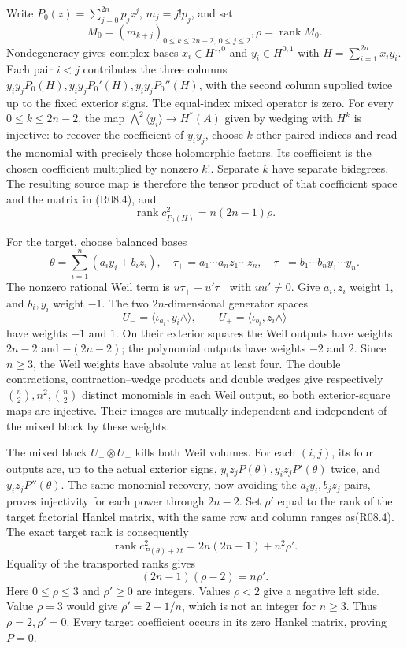Write $P_0(z)=\sum_{j=0}^{2n}p_jz^j$, $m_j=j!p_j$, and set
\[
 M_0=(m_{k+j})_{0\le k\le2n-2,\ 0\le j\le2},
                       \rho=\operatorname{rank}M_0.         \tag{R08.4}
\]
Nondegeneracy gives complex bases $x_i\in H^{1,0}$ and
$y_i\in H^{0,1}$ with $H=\sum_{i=1}^{2n}x_i y_i$.
Each pair $i<j$ contributes the three columns
$y_i y_j P_0(H),y_i y_j P_0'(H),y_i y_j P_0''(H)$, with
the second column supplied twice up to the fixed exterior signs.
The equal-index mixed operator is zero. For every
$0\le k\le2n-2$, the map
$\bigwedge^2\langle y_i\rangle\to H^*(A)$ given by wedging
with $H^k$ is injective: to recover the coefficient of $y_i y_j$,
choose $k$ other paired indices and read the monomial with
precisely those holomorphic factors. Its coefficient is the
chosen coefficient multiplied by nonzero $k!$. Separate $k$
have separate bidegrees. The resulting source map is therefore
the tensor product of that coefficient space and the matrix in
(R08.4), and
\[
                \operatorname{rank}c^2_{P_0(H)}
                          =n(2n-1)\rho.                     \tag{R08.5}
\]

For the target, choose balanced bases
\[
 \theta=\sum_{i=1}^n(a_i y_i+b_i z_i),\quad
 \tau_+=a_1\cdots a_nz_1\cdots z_n,\quad
 \tau_-=b_1\cdots b_ny_1\cdots y_n.
\]
The nonzero rational Weil term is $u\tau_++u'\tau_-$ with
$uu'\ne0$. Give $a_i,z_i$ weight $1$, and $b_i,y_i$ weight
$-1$. The two $2n$-dimensional generator spaces
\[
 U_- =\langle\iota_{a_i},y_i\wedge\rangle,
       \qquad U_+=\langle\iota_{b_i},z_i\wedge\rangle
\]
have weights $-1$ and $1$. On their exterior squares the Weil
outputs have weights $2n-2$ and $-(2n-2)$; the polynomial
outputs have weights $-2$ and $2$. Since $n\ge3$, the Weil
weights have absolute value at least four. The double
contractions, contraction--wedge products and double wedges
give respectively $\binom n2,n^2,\binom n2$ distinct
monomials in each Weil output, so both exterior-square maps
are injective. Their images are mutually independent and
independent of the mixed block by these weights.

The mixed block $U_-\otimes U_+$ kills both Weil volumes.
For each $(i,j)$, its four outputs are, up to the actual exterior
signs, $y_i z_jP(\theta),y_i z_jP'(\theta)$ twice, and
$y_i z_jP''(\theta)$. The same monomial recovery, now
avoiding the $a_i y_i,b_j z_j$ pairs, proves injectivity for
each power through $2n-2$. Set $\rho'$ equal to the rank of
the target factorial Hankel matrix, with the same row and
column ranges as(R08.4). The exact target rank is consequently
\[
        \operatorname{rank}c^2_{P(\theta)+\lambda t}
                  =2n(2n-1)+n^2\rho'.                       \tag{R08.6}
\]
Equality of the transported ranks gives
\[
                 (2n-1)(\rho-2)=n\rho'.                     \tag{R08.7}
\]
Here $0\le\rho\le3$ and $\rho'\ge0$ are integers. Values
$\rho<2$ give a negative left side. Value $\rho=3$ would
give $\rho'=2-1/n$, which is not an integer for $n\ge3$.
Thus $\rho=2,\rho'=0$. Every target coefficient occurs in
its zero Hankel matrix, proving $P=0$.

